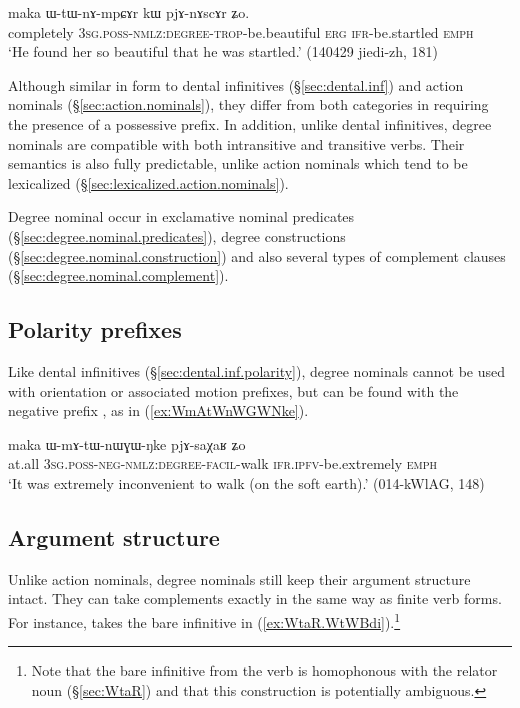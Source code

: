 \begin{exe}
\ex \label{ex:WtWnAmpCAr}
\gll  maka ɯ-tɯ-nɤ-mpɕɤr kɯ pjɤ-nɤscɤr ʑo. \\
completely  \textsc{3sg}.\textsc{poss}-\textsc{nmlz}:\textsc{degree}-\textsc{trop}-be.beautiful \textsc{erg} \textsc{ifr}-be.startled \textsc{emph} \\
\glt `He found her so beautiful that he was startled.' (140429 jiedi-zh, 181)
\end{exe} 
 
Although similar in form to dental infinitives (§\ref{sec:dental.inf}) and action nominals (§\ref{sec:action.nominals}), they differ from both categories in requiring the presence of a possessive prefix. In addition, unlike dental infinitives, degree nominals are compatible with both intransitive and transitive verbs. Their semantics is also fully predictable, unlike action nominals which tend to be lexicalized (§\ref{sec:lexicalized.action.nominals}).

Degree nominal occur in exclamative nominal predicates (§\ref{sec:degree.nominal.predicates}), degree constructions (§\ref{sec:degree.nominal.construction}) and also several types of complement clauses (§\ref{sec:degree.nominal.complement}).

\subsection{Polarity prefixes} \label{sec:degree.nominal.prefixes}
Like dental infinitives (§\ref{sec:dental.inf.polarity}), degree nominals cannot be used with orientation or associated motion prefixes, but can be found with the negative prefix , as in (\ref{ex:WmAtWnWGWNke}).

 \begin{exe}
\ex \label{ex:WmAtWnWGWNke}
\gll  maka ɯ-mɤ-tɯ-nɯɣɯ-ŋke pjɤ-saχaʁ ʑo \\
at.all \textsc{3sg}.\textsc{poss}-\textsc{neg}-\textsc{nmlz}:\textsc{degree}-\textsc{facil}-walk \textsc{ifr}.\textsc{ipfv}-be.extremely \textsc{emph} \\
\glt `It was extremely inconvenient to walk (on the soft earth).' (014-kWlAG, 148)
\end{exe}


\subsection{Argument structure} \label{sec:degree.nominal.arguments}
Unlike action nominals, degree nominals still keep their argument structure intact. They can take complements exactly in the same way as finite verb forms. For instance,  takes the bare infinitive  in (\ref{ex:WtaR.WtWBdi}).\footnote{Note that the bare infinitive  from the verb  is homophonous with the relator noun  (§\ref{sec:WtaR}) and that this construction is potentially ambiguous. }

